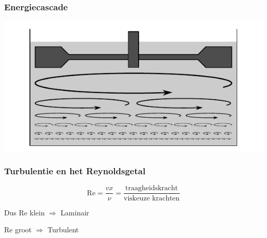 \documentclass[t]{beamer}
\begin{document}
  	\begin{frame}
		\frametitle{Energiecascade}
		\vspace{1cm}
		\center
		\includegraphics{../fig/uitwendige_stroming/Energie_cascade}
  	\end{frame}
  	\begin{frame}
		\frametitle{Turbulentie en het Reynoldsgetal}
		\vspace{1cm}
		\begin{equation*}
			\text{Re} = \dfrac{v x}{\nu} = \dfrac{\text{traagheidskracht}}{\text{viskeuze krachten}}
		\end{equation*}
		
		\vspace{1cm}
		Dus
		\center
		\vspace{0.5cm}
		\pause
		Re klein $\Longrightarrow$ Laminair
		
		\vspace{0.5cm}
		\pause
		Re groot $\Longrightarrow$ Turbulent 
  	\end{frame}
\end{document}
